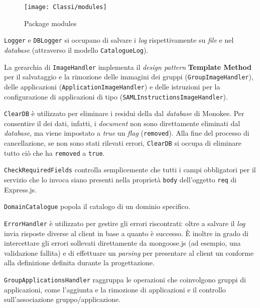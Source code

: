 \begin{figure}[hbpc]
  \begin{center}
    \texttt{[image: Classi/modules]}
  \caption[Package modules]{Package modules}
  \label{fig:modules}
  \end{center} 
\end{figure}

\texttt{Logger} e \texttt{DBLogger} si occupano di salvare i \textit{log} rispettivamente su \textit{file} e nel \textit{database} (attraverso il modello \texttt{CatalogueLog}).

La gerarchia di \texttt{ImageHandler} implementa il \textit{design pattern} \textbf{Template Method} per il salvataggio e la rimozione delle immagini dei gruppi (\texttt{GroupImageHandler}), delle applicazioni (\texttt{ApplicationImageHandler}) e delle istruzioni per la configurazione di applicazioni di tipo  (\texttt{SAMLInstructionsImageHandler}). 

\texttt{ClearDB} è utilizzato per eliminare i residui della  dal \textit{database} di Monokee. Per consentire il  dei dati, infatti, i \textit{document} non sono direttamente eliminati dal \textit{database}, ma viene impostato a \textit{true} un \textit{flag} (\texttt{removed}). Alla fine del processo di cancellazione, se non sono stati rilevati errori, \texttt{ClearDB} si occupa di eliminare tutto ciò che ha \texttt{removed} a \texttt{true}. 

\texttt{CheckRequiredFields} controlla semplicemente che tutti i campi obbligatori per il servizio che lo invoca siano presenti nella proprietà \texttt{body} dell'oggetto \texttt{req} di Express.js.

\texttt{DomainCatalogue} popola il catalogo di un dominio specifico. 

\texttt{ErrorHandler} è utilizzato per gestire gli errori riscontrati: oltre a salvare il \textit{log} invia risposte diverse al client in base a quanto è successo. È inoltre in grado di intercettare gli errori sollevati direttamente da mongoose.js (ad esempio, una validazione fallita) e di effettuare un \textit{parsing} per presentare al client un  conforme alla definizione definita durante la progettazione.

\texttt{GroupApplicationsHandler} raggruppa le operazioni che coinvolgono gruppi di applicazioni, come l'aggiunta e la rimozione di applicazioni e il controllo sull'associazione gruppo/applicazione.

